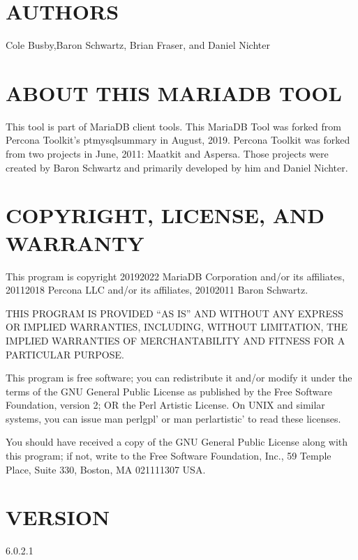 \documentclass[letterpaper,10pt,english]{sphinxmanual}
\begin{document}
\section{AUTHORS}
\label{\detokenize{mariadb-database-summary:authors}}
Cole Busby,Baron Schwartz, Brian Fraser, and Daniel Nichter


\section{ABOUT THIS MARIADB TOOL}
\label{\detokenize{mariadb-database-summary:about-this-mariadb-tool}}
This tool is part of MariaDB client tools. This MariaDB Tool was forked from
Percona Toolkit’s pt\sphinxhyphen{}mysql\sphinxhyphen{}summary in August, 2019. Percona Toolkit was forked
from two projects in June, 2011: Maatkit and Aspersa.  Those projects were
created by Baron Schwartz and primarily developed by him and Daniel Nichter.


\section{COPYRIGHT, LICENSE, AND WARRANTY}
\label{\detokenize{mariadb-database-summary:copyright-license-and-warranty}}
This program is copyright 2019\sphinxhyphen{}2022 MariaDB Corporation and/or its affiliates,
2011\sphinxhyphen{}2018 Percona LLC and/or its affiliates, 2010\sphinxhyphen{}2011 Baron Schwartz.

THIS PROGRAM IS PROVIDED “AS IS” AND WITHOUT ANY EXPRESS OR IMPLIED
WARRANTIES, INCLUDING, WITHOUT LIMITATION, THE IMPLIED WARRANTIES OF
MERCHANTABILITY AND FITNESS FOR A PARTICULAR PURPOSE.

This program is free software; you can redistribute it and/or modify it under
the terms of the GNU General Public License as published by the Free Software
Foundation, version 2; OR the Perl Artistic License.  On UNIX and similar
systems, you can issue \textasciigrave{}man perlgpl’ or \textasciigrave{}man perlartistic’ to read these
licenses.

You should have received a copy of the GNU General Public License along with
this program; if not, write to the Free Software Foundation, Inc., 59 Temple
Place, Suite 330, Boston, MA  02111\sphinxhyphen{}1307  USA.


\section{VERSION}
\label{\detokenize{mariadb-database-summary:version}}
 6.0.2.1
\end{document}
